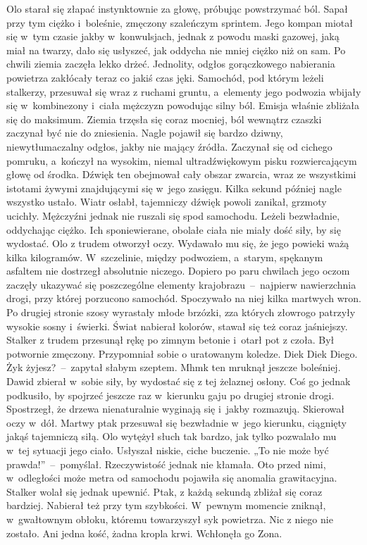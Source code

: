 \documentclass[../MAIN.tex]{subfiles}
\begin{document}
\pp
Olo starał się złapać instynktownie za głowę, próbując powstrzymać ból. Sapał przy tym ciężko i~boleśnie, zmęczony szaleńczym sprintem. Jego kompan miotał się w~tym czasie jakby w~konwulsjach, jednak z powodu maski gazowej, jaką miał na twarzy, dało się usłyszeć, jak oddycha nie mniej ciężko niż on sam. Po chwili ziemia zaczęła lekko drżeć. Jednolity, odgłos gorączkowego nabierania powietrza zakłócały teraz co jakiś czas jęki. Samochód, pod którym leżeli stalkerzy, przesuwał się wraz z ruchami gruntu, a~elementy jego podwozia wbijały się w~kombinezony i~ciała mężczyzn powodując silny ból.
\pp
Emisja właśnie zbliżała się do maksimum. Ziemia trzęsła się coraz mocniej, ból wewnątrz czaszki zaczynał być nie do zniesienia. Nagle pojawił się bardzo dziwny, niewytłumaczalny odgłos, jakby nie mający źródła. Zaczynał się od cichego pomruku, a~kończył na wysokim, niemal ultradźwiękowym pisku rozwiercającym głowę od środka. Dźwięk ten obejmował cały obszar zwarcia, wraz ze wszystkimi istotami żywymi znajdującymi się w~jego zasięgu.
\pp
Kilka sekund później nagle wszystko ustało. Wiatr osłabł, tajemniczy dźwięk powoli zanikał, grzmoty ucichły. Mężczyźni jednak nie ruszali się spod samochodu. Leżeli bezwładnie, oddychając ciężko. Ich sponiewierane, obolałe ciała nie miały dość siły, by się wydostać. Olo z trudem otworzył oczy. Wydawało mu się, że jego powieki ważą kilka kilogramów. W~szczelinie, między podwoziem, a~starym, spękanym asfaltem nie dostrzegł absolutnie niczego. Dopiero po paru chwilach jego oczom zaczęły ukazywać się poszczególne elementy krajobrazu~--~najpierw nawierzchnia drogi, przy której porzucono samochód. Spoczywało na niej kilka martwych wron. Po drugiej stronie szosy wyrastały młode brzózki, zza których złowrogo patrzyły wysokie sosny i~świerki. Świat nabierał kolorów, stawał się też coraz jaśniejszy. Stalker z trudem przesunął rękę po zimnym betonie i~otarł pot z czoła. Był potwornie zmęczony. Przypomniał sobie o uratowanym koledze.
\sx Die\3k Die\3k Diego. Ży\3k żyjesz?~--~zapytał słabym szeptem.
\xx Mhm\3k \x ten mruknął jeszcze boleśniej.
\qd
\hspace{19.4em}Dawid zbierał w~sobie siły, by wydostać się z tej żelaznej osłony. Coś go jednak podkusiło, by spojrzeć jeszcze raz w~kierunku gaju po drugiej stronie drogi. Spostrzegł, że drzewa nienaturalnie wyginają się i~jakby rozmazują. Skierował oczy w~dół. Martwy ptak przesuwał się bezwładnie w~jego kierunku, ciągnięty jakąś tajemniczą siłą. Olo wytężył słuch tak bardzo, jak tylko pozwalało mu w~tej sytuacji jego ciało. Usłyszał niskie, ciche buczenie. „To nie może być prawda!”~--~pomyślał. Rzeczywistość jednak nie kłamała. Oto przed nimi, w~odległości może metra od samochodu pojawiła się anomalia grawitacyjna. Stalker wolał się jednak upewnić. Ptak, z każdą sekundą zbliżał się coraz bardziej. Nabierał też przy tym szybkości. W~pewnym momencie zniknął, w~gwałtownym obłoku, któremu towarzyszył syk powietrza. Nic z niego nie zostało. Ani jedna kość, żadna kropla krwi. Wchłonęła go Zona.
\end{document}
